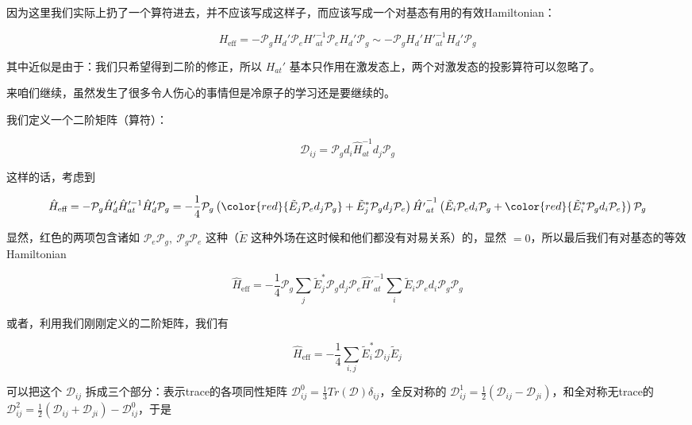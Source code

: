因为这里我们实际上扔了一个算符进去，并不应该写成这样子，而应该写成一个{\color{red}{仅}}对基态有用的有效Hamiltonian：

\begin{equation}
H_{\text{eff}} = -\mathcal{P}_g H_d' \mathcal{P}_e H'^{-1}_{at} \mathcal{P}_e H_d' \mathcal{P}_g \sim -\mathcal{P}_g H_d' H'^{-1}_{at} H_d' \mathcal{P}_g 
\end{equation}

其中近似是由于：我们只希望得到二阶的修正，所以 $H_{at}'$ 基本只作用在激发态上，两个对激发态的投影算符可以忽略了。



来咱们继续，虽然发生了很多令人伤心的事情但是冷原子的学习还是要继续的。

我们定义一个二阶矩阵（算符）：

\begin{equation}
\mathcal{D}_{ij} = \mathcal{P}_g d_i \hat{H}_{at}^{-1} d_j \mathcal{P}_g 
\end{equation}

这样的话，考虑到

\begin{equation}
\hat{H}_{\text{eff}} = -\mathcal{P}_g \hat{H}_d' \hat{H}'^{-1}_{at} \hat{H}_d' \mathcal{P}_g  = -\frac{1}{4} \mathcal{P}_g \left({\color{red}{\tilde{E}_j\mathcal{P}_e d_j \mathcal{P}_g}} + \tilde{E}_j^*\mathcal{P}_g d_j \mathcal{P}_e\right) \hat{H'}_{at}^{-1} \left(\tilde{E}_i\mathcal{P}_e d_i \mathcal{P}_g + {\color{red}{\tilde{E}_i^*\mathcal{P}_g d_i \mathcal{P}_e}}\right) \mathcal{P}_g
\end{equation}

显然，红色的两项包含诸如 $\mathcal{P}_e\mathcal{P}_g,\ \mathcal{P}_g\mathcal{P}_e$ 这种（$\tilde{E}$ 这种外场在这时候和他们都没有对易关系）的，显然 $=0$，所以最后我们有对基态的等效Hamiltonian

\begin{equation}
\hat{H}_{\text{eff}} = -\frac{1}{4} \mathcal{P}_g \sum_j \tilde{E}_j^*\mathcal{P}_g d_j \mathcal{P}_e \hat{H'}_{at}^{-1} \sum_i \tilde{E}_i\mathcal{P}_e d_i \mathcal{P}_g  \mathcal{P}_g 
\end{equation}

或者，利用我们刚刚定义的二阶矩阵，我们有

\begin{equation}
\hat{H}_{\text{eff}} = -\frac{1}{4}\sum_{i,j} \tilde{E}_i^* \mathcal{D}_{ij} \tilde{E}_j
\end{equation}

可以把这个 $\mathcal{D}_{ij}$ 拆成三个部分：表示trace的各项同性矩阵 $\mathcal{D}_{ij}^0 = \frac{1}{3}Tr(\mathcal{D})\delta_{ij}$，全反对称的 $\mathcal{D}_{ij}^1 = \frac{1}{2}(\mathcal{D}_{ij} - \mathcal{D}_{ji})$，和全对称无trace的 $\mathcal{D}_{ij}^2 = \frac{1}{2}(\mathcal{D}_{ij} + \mathcal{D}_{ji}) - \mathcal{D}_{ij}^0$，于是

